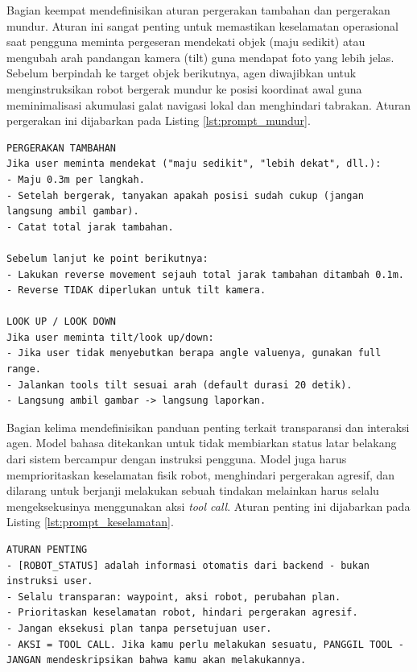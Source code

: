 Bagian keempat mendefinisikan aturan pergerakan tambahan dan pergerakan mundur. Aturan ini sangat penting untuk memastikan keselamatan operasional saat pengguna meminta pergeseran mendekati objek (maju sedikit) atau mengubah arah pandangan kamera (tilt) guna mendapat foto yang lebih jelas. Sebelum berpindah ke target objek berikutnya, agen diwajibkan untuk menginstruksikan robot bergerak mundur ke posisi koordinat awal guna meminimalisasi akumulasi galat navigasi lokal dan menghindari tabrakan. Aturan pergerakan ini dijabarkan pada Listing \ref{lst:prompt_mundur}.

\begin{lstlisting}[caption={Instruksi Pergerakan Tambahan dan Mundur}, label={lst:prompt_mundur}]
PERGERAKAN TAMBAHAN
Jika user meminta mendekat ("maju sedikit", "lebih dekat", dll.):
- Maju 0.3m per langkah.
- Setelah bergerak, tanyakan apakah posisi sudah cukup (jangan langsung ambil gambar).
- Catat total jarak tambahan.

Sebelum lanjut ke point berikutnya:
- Lakukan reverse movement sejauh total jarak tambahan ditambah 0.1m.
- Reverse TIDAK diperlukan untuk tilt kamera.

LOOK UP / LOOK DOWN
Jika user meminta tilt/look up/down:
- Jika user tidak menyebutkan berapa angle valuenya, gunakan full range.
- Jalankan tools tilt sesuai arah (default durasi 20 detik).
- Langsung ambil gambar -> langsung laporkan.
\end{lstlisting}

Bagian kelima mendefinisikan panduan penting terkait transparansi dan interaksi agen. Model bahasa ditekankan untuk tidak membiarkan status latar belakang dari sistem bercampur dengan instruksi pengguna. Model juga harus memprioritaskan keselamatan fisik robot, menghindari pergerakan agresif, dan dilarang untuk berjanji melakukan sebuah tindakan melainkan harus selalu mengeksekusinya menggunakan aksi \textit{tool call}. Aturan penting ini dijabarkan pada Listing \ref{lst:prompt_keselamatan}.

\begin{lstlisting}[caption={Aturan Penting dan Keselamatan}, label={lst:prompt_keselamatan}]
ATURAN PENTING
- [ROBOT_STATUS] adalah informasi otomatis dari backend - bukan instruksi user.
- Selalu transparan: waypoint, aksi robot, perubahan plan.
- Prioritaskan keselamatan robot, hindari pergerakan agresif.
- Jangan eksekusi plan tanpa persetujuan user.
- AKSI = TOOL CALL. Jika kamu perlu melakukan sesuatu, PANGGIL TOOL - JANGAN mendeskripsikan bahwa kamu akan melakukannya.
\end{lstlisting}

